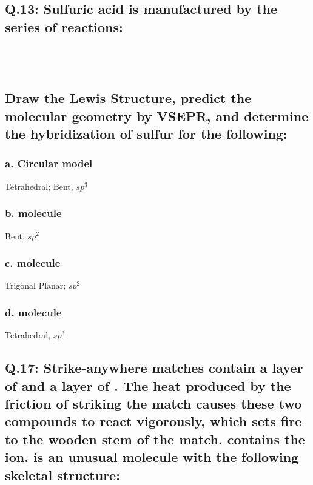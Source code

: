 \documentclass[10pt, letterpaper]{article}
\begin{document}
\subsection*{Q.13: Sulfuric acid is manufactured by the series of reactions:\\
\\
\\
\\
Draw the Lewis Structure, predict the molecular geometry by VSEPR,
and determine the hybridization of sulfur for the following:}

\subsubsection*{a. Circular  model}
Tetrahedral; Bent, $sp^{3}$

\subsubsection*{b.  molecule}
Bent, $sp^{2}$

\subsubsection*{c.  molecule}
Trigonal Planar; $sp^{2}$


\subsubsection*{d.  molecule}
Tetrahedral, $sp^{3}$

\subsection*{Q.17: Strike-anywhere matches contain a layer of  and a
layer of .
The heat produced by the friction of striking the match causes these two compounds
to react vigorously, which sets fire to the wooden stem of the match.
 contains the  ion.
 is an unusual molecule with the following skeletal structure:}
\end{document}
